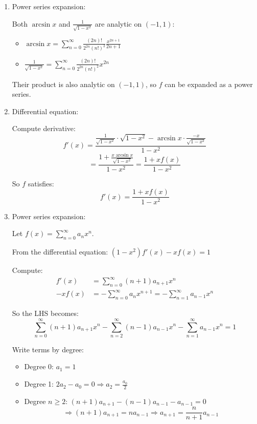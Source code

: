 \documentclass[12pt]{article}
\begin{document}
\begin{answerbox}
\begin{enumerate}
    \item Power series expansion:
    
    Both $\arcsin x$ and $\frac{1}{\sqrt{1-x^2}}$ are analytic on $(-1,1)$:
    \begin{itemize}
        \item $\arcsin x = \sum_{n=0}^\infty \frac{(2n)!}{2^{2n}(n!)^2} \frac{x^{2n+1}}{2n+1}$
        \item $\frac{1}{\sqrt{1-x^2}} = \sum_{n=0}^\infty \frac{(2n)!}{2^{2n}(n!)^2} x^{2n}$
    \end{itemize}
    
    Their product is also analytic on $(-1,1)$, so $f$ can be expanded as a power series.
    
    \item Differential equation:
    
    Compute derivative:
    \[
    f'(x) = \frac{\frac{1}{\sqrt{1-x^2}} \cdot \sqrt{1-x^2} - \arcsin x \cdot \frac{-x}{\sqrt{1-x^2}}}{1-x^2}
    \]
    \[
    = \frac{1 + \frac{x \arcsin x}{\sqrt{1-x^2}}}{1-x^2} = \frac{1 + x f(x)}{1-x^2}
    \]
    
    So $f$ satisfies:
    \[
    f'(x) = \frac{1 + x f(x)}{1-x^2}
    \]
    
    \item Power series expansion:
    
    Let $f(x) = \sum_{n=0}^\infty a_n x^n$.
    
    From the differential equation: $(1-x^2)f'(x) - x f(x) = 1$
    
    Compute:
    \begin{align*}
    f'(x) &= \sum_{n=0}^\infty (n+1) a_{n+1} x^n \\
    -x f(x) &= -\sum_{n=0}^\infty a_n x^{n+1} = -\sum_{n=1}^\infty a_{n-1} x^n
    \end{align*}
    
    So the LHS becomes:
    \[
    \sum_{n=0}^\infty (n+1) a_{n+1} x^n - \sum_{n=2}^\infty (n-1) a_{n-1} x^n - \sum_{n=1}^\infty a_{n-1} x^n = 1
    \]
    
    Write terms by degree:
    \begin{itemize}
        \item Degree 0: $a_1 = 1$
        \item Degree 1: $2a_2 - a_0 = 0 \Rightarrow a_2 = \frac{a_0}{2}$
        \item Degree $n \geq 2$: $(n+1)a_{n+1} - (n-1)a_{n-1} - a_{n-1} = 0$
        \[
        \Rightarrow (n+1)a_{n+1} = n a_{n-1} \Rightarrow a_{n+1} = \frac{n}{n+1} a_{n-1}
        \]
    \end{itemize}
    

\end{enumerate}
\end{answerbox}
\end{document}
